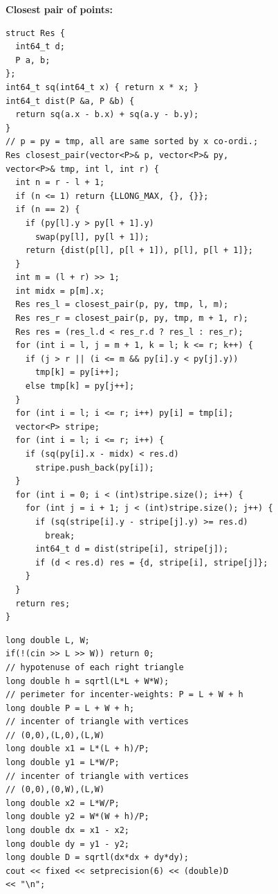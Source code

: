 \vspace{2em}
\begin{center}
\end{center}

\switchcolumn

\textbf{Closest pair of points:}

\begin{lstlisting}
struct Res {
  int64_t d;
  P a, b;
};
int64_t sq(int64_t x) { return x * x; }
int64_t dist(P &a, P &b) {
  return sq(a.x - b.x) + sq(a.y - b.y);
}
// p = py = tmp, all are same sorted by x co-ordi.;
Res closest_pair(vector<P>& p, vector<P>& py,
vector<P>& tmp, int l, int r) {
  int n = r - l + 1;
  if (n <= 1) return {LLONG_MAX, {}, {}};
  if (n == 2) {
    if (py[l].y > py[l + 1].y)
      swap(py[l], py[l + 1]);
    return {dist(p[l], p[l + 1]), p[l], p[l + 1]};
  }
  int m = (l + r) >> 1;
  int midx = p[m].x;
  Res res_l = closest_pair(p, py, tmp, l, m);
  Res res_r = closest_pair(p, py, tmp, m + 1, r);
  Res res = (res_l.d < res_r.d ? res_l : res_r);
  for (int i = l, j = m + 1, k = l; k <= r; k++) {
    if (j > r || (i <= m && py[i].y < py[j].y))
      tmp[k] = py[i++];
    else tmp[k] = py[j++];
  }
  for (int i = l; i <= r; i++) py[i] = tmp[i];
  vector<P> stripe;
  for (int i = l; i <= r; i++) {
    if (sq(py[i].x - midx) < res.d)
      stripe.push_back(py[i]);
  }
  for (int i = 0; i < (int)stripe.size(); i++) {
    for (int j = i + 1; j < (int)stripe.size(); j++) {
      if (sq(stripe[i].y - stripe[j].y) >= res.d)
        break;
      int64_t d = dist(stripe[i], stripe[j]);
      if (d < res.d) res = {d, stripe[i], stripe[j]};
    }
  }
  return res;
}
\end{lstlisting}

\begin{lstlisting}
long double L, W;
if(!(cin >> L >> W)) return 0;
// hypotenuse of each right triangle
long double h = sqrtl(L*L + W*W);
// perimeter for incenter-weights: P = L + W + h
long double P = L + W + h;
// incenter of triangle with vertices
// (0,0),(L,0),(L,W)
long double x1 = L*(L + h)/P;
long double y1 = L*W/P;
// incenter of triangle with vertices
// (0,0),(0,W),(L,W)
long double x2 = L*W/P;
long double y2 = W*(W + h)/P;
long double dx = x1 - x2;
long double dy = y1 - y2;
long double D = sqrtl(dx*dx + dy*dy);
cout << fixed << setprecision(6) << (double)D
<< "\n";
\end{lstlisting}

